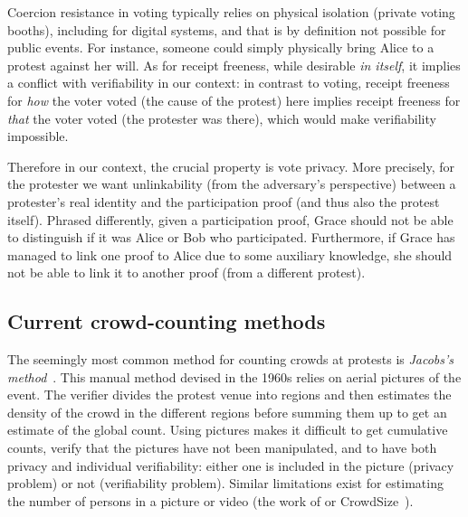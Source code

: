 Coercion resistance in voting typically relies on physical isolation
(\eg private voting booths), including for digital systems, 
and that is by definition not possible for public events.
For instance, someone could simply physically bring Alice to a protest against her will.
As for receipt freeness, while
desirable \emph{in itself}, it implies a conflict with verifiability in our context:
in contrast to voting, receipt freeness for \emph{how} the voter voted (\ie the 
cause of the protest) here implies receipt freeness for \emph{that} the voter voted 
(\ie the protester was there), which would make verifiability impossible.

Therefore in our context, the crucial property is  vote privacy.
More precisely, for the protester we want unlinkability (from the adversary's 
perspective) between a protester's real identity and the participation proof 
(and thus also the protest itself).
Phrased differently, given a participation proof, Grace should not be able to 
distinguish if it was Alice or Bob who participated.
Furthermore, if Grace has managed to link one proof to Alice due to some 
auxiliary knowledge, she should not be able to link it to another proof (from a different protest).

\subsection{Current crowd-counting methods}

The seemingly most common method for counting crowds at protests is \emph{Jacobs's method}~\cite{2016DemonstrationsInSeoul,BBCHowToCountProtestNumbers,HowWillWeKnowTrumpInauguralCrowdSize,TheXManMarch,TheCrowdNumbersGame}.
This manual method devised in the 1960s relies on aerial pictures of the event.
The verifier divides the protest venue into regions and then estimates the density of the crowd in the different regions before summing them up to get an estimate of the global count. Using pictures makes it difficult to get cumulative counts, verify that the pictures have not been manipulated, and to have both privacy and individual verifiability: either one is included in the picture (privacy problem) or not (verifiability problem). Similar limitations exist for estimating the number of persons in a picture or video (\eg the work of \cite{NNCrowdCounting} or  CrowdSize~\cite{CrowdSize}).


